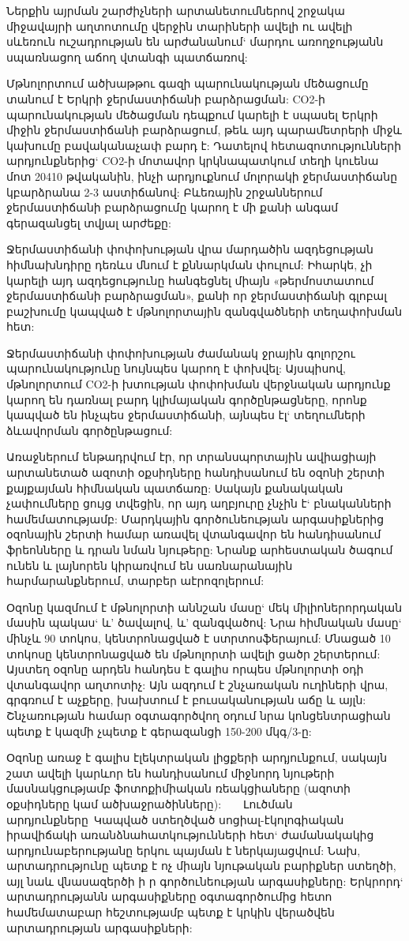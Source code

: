 \documentclass[12pt]{article}
\begin{document}
\begin{sloppypar}
Ներքին այրման շարժիչների արտանետումներով շրջակա միջավայրի աղտոտումը վերջին տարիների ավելի ու ավելի սևեռուն ուշադրության են արժանանում` մարդու առողջությանն սպառնացող աճող վտանգի պատճառով:

Մթնոլորտում ածխաթթու գազի պարունակության մեծացումը տանում է Երկրի ջերմաստիճանի բարձրացման: CO2-ի պարունակության մեծացման դեպքում կարելի է սպասել Երկրի միջին ջերմաստիճանի բարձրացում, թեև այդ պարամետրերի միջև կախումը բավականաչափ բարդ է: Դատելով հետազոտությունների արդյունքներից` CO2-ի մոտավոր կրկնապատկում տեղի կուենա մոտ 20410 թվականին, ինչի արդյուքնում մոլորակի ջերմաստիճանը կբարձրանա 2-3 աստիճանով: Բևեռային շրջաններում ջերմաստիճանի բարձրացումը կարող է մի քանի անգամ գերազանցել տվյալ արժեքը:

Ջերմաստիճանի փոփոխության վրա մարդածին ազդեցության հիմնախնդիրը դեռևս մնում է քննարկման փուլում: Իհարկե, չի կարելի այդ ազդեցությունը հանգեցնել միայն «թերմոստատում ջերմաստիճանի բարձրացման», քանի որ ջերմաստիճանի գլոբալ բաշխումը կապված է մթնոլորտային զանգվածների տեղափոխման հետ:

Ջերմաստիճանի փոփոխության ժամանակ ջրային գոլորշու պարունակությունը նույնպես կարող է փոխվել: Այսպիսով, մթնոլորտում CO2-ի խտության փոփոխման վերջնական արդյունք կարող են դառնալ բարդ կլիմայական գործընթացները, որոնք կապված են ինչպես ջերմաստիճանի, այնպես էլ` տեղումների ձևավորման գործընթացում:

Առաջներում ենթադրվում էր, որ տրանսպորտային ավիացիայի արտանետած ազոտի օքսիդները հանդիսանում են օզոնի շերտի քայքայման հիմնական պատճառը: Սակայն քանակական չափումները ցույց տվեցին, որ այդ աղբյուրը չնչին է` բնականների համեմատությամբ: Մարդկային գործունեության արգասիքներից օզոնային շերտի համար առավել վտանգավոր են հանդիսանում ֆրեոնները և դրան նման նյութերը: Նրանք արհեստական ծագում ունեն և լայնորեն կիրառվում են սառնարանային հարմարանքներում, տարբեր աէրոզոլերում:

Օզոնը կազմում է մթնոլորտի աննշան մասը` մեկ միլիոներորդական մասին պակաս` և' ծավալով, և' զանգվածով: Նրա հիմնական մասը` մինչև 90 տոկոս, կենտրոնացված է ստրտոսֆերայում: Մնացած 10 տոկոսը կենտրոնացված են մթնոլորտի ավելի ցածր շերտերում: Այստեղ օզոնը արդեն հանդես է գալիս որպես մթնոլորտի օդի վտանգավոր աղտոտիչ: Այն ազդում է շնչառական ուղիների վրա, գրգռում է աչքերը, խախտում է բուսականության աճը և այլն: Շնչառության համար օգտագործվող օդում նրա կոնցենտրացիան պետք է կազմի չպետք է գերազանցի 150-200 մկգ/3-ը:

Օզոնը առաջ է գալիս էլեկտրական լիցքերի արդյունքում, սակայն շատ ավելի կարևոր են հանդիսանում միջնորդ նյութերի մասնակցությամբ ֆոտոքիմիական ռեակցիաները (ազոտի օքսիդները կամ ածխաջրածինները):    Լուծման արդյունքները Կապված ստեղծված սոցիալ-էկոլոգիական իրավիճակի առանձնահատկությունների հետ` ժամանակակից արդյունաբերությանը երկու պայման է ներկայացվում: Նախ, արտադրությունը պետք է ոչ միայն նյութական բարիքներ ստեղծի, այլ նաև վնասազերծի ի ր գործունեության արգասիքները: Երկրորդ` արտադրությանն արգասիքները օգտագործումից հետո համեմատաբար հեշտությամբ պետք է կրկին վերածվեն արտադրության արգասիքների:


\end{sloppypar}
\end{document}
